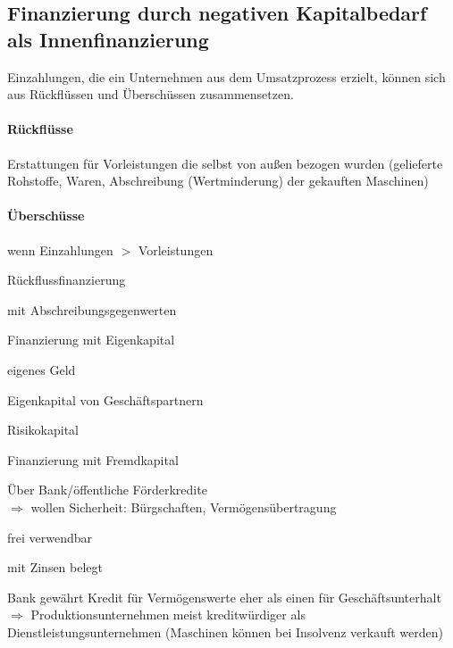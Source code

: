 \clearpage
\subsection{Finanzierung durch negativen Kapitalbedarf als Innenfinanzierung}
Einzahlungen, die ein Unternehmen aus dem Umsatzprozess erzielt, können sich aus Rückflüssen und Überschüssen zusammensetzen.

\paragraph{Rückflüsse}
Erstattungen für Vorleistungen die selbst von außen bezogen wurden (gelieferte Rohstoffe, Waren, Abschreibung (Wertminderung) der gekauften Maschinen)

\paragraph{Überschüsse}
wenn Einzahlungen $>$ Vorleistungen

\begin{compactitem}
	\item Rückflussfinanzierung
	\begin{compactitem}
		\item mit Abschreibungsgegenwerten
	\end{compactitem}
	\item Finanzierung mit Eigenkapital
	\begin{compactitem}
		\item eigenes Geld
		\item Eigenkapital von Geschäftspartnern
		\item Risikokapital
	\end{compactitem}
	\item Finanzierung mit Fremdkapital
	\begin{compactitem}
		\item Über Bank/öffentliche Förderkredite\\
		$\Rightarrow$ wollen Sicherheit: Bürgschaften, Vermögensübertragung
		\item frei verwendbar
		\item mit Zinsen belegt
		\item Bank gewährt Kredit für Vermögenswerte eher als einen für Geschäftsunterhalt\\
		$\Rightarrow$ Produktionsunternehmen meist kreditwürdiger als Dienstleistungsunternehmen (Maschinen können bei Insolvenz verkauft werden)
	\end{compactitem}
\end{compactitem}

